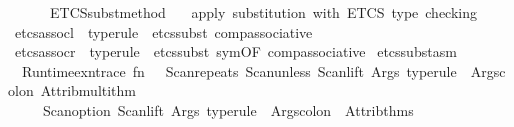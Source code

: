 \begin{isabellebody}
\ \ \ \ \ {\isachargreater}{\kern0pt}{\isachargreater}{\kern0pt}\ ETCS{\isacharunderscore}{\kern0pt}subst{\isacharunderscore}{\kern0pt}method{\isacartoucheclose}\ \isanewline
\ \ {\isachardoublequoteopen}apply\ substitution\ with\ ETCS\ type\ checking{\isachardoublequoteclose}%
\endisatagML
{\isafoldML}%
%
\isadelimML
\isanewline
%
\endisadelimML
\isanewline
{}\isamarkupfalse%
\ etcs{\isacharunderscore}{\kern0pt}assocl\ \ type{\isacharunderscore}{\kern0pt}rule\ {\isacharequal}{\kern0pt}\ {\isacharparenleft}{\kern0pt}etcs{\isacharunderscore}{\kern0pt}subst\ comp{\isacharunderscore}{\kern0pt}associative{}{\isacharparenright}{\kern0pt}{\isacharplus}{\kern0pt}\isanewline
{}\isamarkupfalse%
\ etcs{\isacharunderscore}{\kern0pt}assocr\ \ type{\isacharunderscore}{\kern0pt}rule\ {\isacharequal}{\kern0pt}\ {\isacharparenleft}{\kern0pt}etcs{\isacharunderscore}{\kern0pt}subst\ sym{\isacharbrackleft}{\kern0pt}OF\ comp{\isacharunderscore}{\kern0pt}associative{}{\isacharbrackright}{\kern0pt}{\isacharparenright}{\kern0pt}{\isacharplus}{\kern0pt}\isanewline
%
\isadelimML
\isanewline
%
\endisadelimML
%
\isatagML
{}\isamarkupfalse%
\ etcs{\isacharunderscore}{\kern0pt}subst{\isacharunderscore}{\kern0pt}asm\ {\isacharequal}{\kern0pt}\ \isanewline
\ \ {\isacartoucheopen}Runtime{\isachardot}{\kern0pt}exn{\isacharunderscore}{\kern0pt}trace\ {\isacharparenleft}{\kern0pt}fn\ {\isacharunderscore}{\kern0pt}\ {\isacharequal}{\kern0pt}{\isachargreater}{\kern0pt}\ Scan{\isachardot}{\kern0pt}repeats\ {\isacharparenleft}{\kern0pt}Scan{\isachardot}{\kern0pt}unless\ {\isacharparenleft}{\kern0pt}Scan{\isachardot}{\kern0pt}lift\ {\isacharparenleft}{\kern0pt}Args{\isachardot}{\kern0pt}{\isachardollar}{\kern0pt}{\isachardollar}{\kern0pt}{\isachardollar}{\kern0pt}\ {\isachardoublequote}{\kern0pt}type{\isacharunderscore}{\kern0pt}rule{\isachardoublequote}{\kern0pt}\ {\isacharminus}{\kern0pt}{\isacharminus}{\kern0pt}\ Args{\isachardot}{\kern0pt}colon{\isacharparenright}{\kern0pt}{\isacharparenright}{\kern0pt}\ Attrib{\isachardot}{\kern0pt}multi{\isacharunderscore}{\kern0pt}thm{\isacharparenright}{\kern0pt}\isanewline
\ \ \ \ {\isacharminus}{\kern0pt}{\isacharminus}{\kern0pt}\ Scan{\isachardot}{\kern0pt}option\ {\isacharparenleft}{\kern0pt}{\isacharparenleft}{\kern0pt}Scan{\isachardot}{\kern0pt}lift\ {\isacharparenleft}{\kern0pt}Args{\isachardot}{\kern0pt}{\isachardollar}{\kern0pt}{\isachardollar}{\kern0pt}{\isachardollar}{\kern0pt}\ {\isachardoublequote}{\kern0pt}type{\isacharunderscore}{\kern0pt}rule{\isachardoublequote}{\kern0pt}\ {\isacharminus}{\kern0pt}{\isacharminus}{\kern0pt}\ Args{\isachardot}{\kern0pt}colon{\isacharparenright}{\kern0pt}{\isacharparenright}{\kern0pt}\ {\isacharbar}{\kern0pt}{\isacharminus}{\kern0pt}{\isacharminus}{\kern0pt}\ Attrib{\isachardot}{\kern0pt}thms{\isacharparenright}{\kern0pt}\isanewline

\end{isabellebody}
